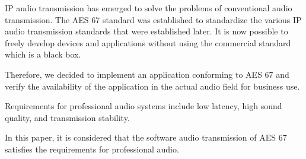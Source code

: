 \begin{eabstract}

  IP audio transmission has emerged to solve the problems of conventional audio transmission. The AES 67 standard was established to standardize the various IP audio transmission standards that were established later. It is now possible to freely develop devices and applications without using the commercial standard which is a black box.

  Therefore, we decided to implement an application conforming to AES 67 and verify the availability of the application in the actual audio field for business use.

  Requirements for professional audio systems include low latency, high sound quality, and transmission stability.

  In this paper, it is considered that the software audio transmission of AES 67 satisfies the requirements for professional audio.

\end{eabstract}
